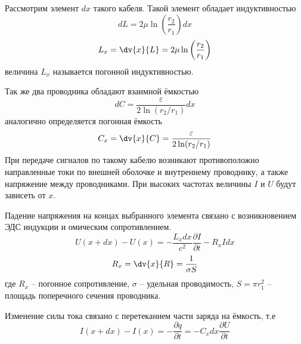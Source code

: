 \documentclass{report}
\begin{document}
Рассмотрим элемент $dx$ такого кабеля. Такой элемент обладает индуктивностью
\begin{equation}
	dL=2\mu\ln\left(\frac{r_2}{r_1}\right)dx
\end{equation}
\begin{equation}
	L_x=\dv{x}{L}=2\mu\ln\left(\frac{r_2}{r_1}\right)
\end{equation}
величина $L_x$ называется погонной индуктивностью.

Так же два проводника обладают взаимной ёмкостью
\begin{equation}
	dC=\frac{\varepsilon}{2\ln(r_2/r_1)}dx
\end{equation}
аналогично определяется погонная ёмкость
\begin{equation}
	C_x=\dv{x}{C}=\frac{\varepsilon}{2\ln(r_2/r_1)}
\end{equation}
При передаче сигналов по такому
кабелю возникают противоположно направленные токи по внешней оболочке и
внутреннему проводнику, а также напряжение между проводниками. При высоких
частотах величины $I$ и $U$ будут зависеть от $x$.

Падение напряжения на концах выбранного элемента связано с возникновением ЭДС
индукции и омическим сопротивлением.
\begin{equation}\label{Ueq}
	U(x+dx)-U(x)=-\frac{L_xdx}{c^2}\frac{\partial I}{\partial t}-R_xIdx
\end{equation}
\begin{equation}
	R_x = \dv{x}{R} = \frac{1}{\sigma S}
\end{equation}
где $R_x$ -- погонное сопротивление, $\sigma$ --
удельная проводимость, $S=\pi r_1^2$ -- площадь поперечного сечения проводника.

Изменение силы тока связано с перетеканием части заряда на ёмкость, т.е
\begin{equation}\label{Ieq}
	I(x+dx)-I(x)=-\frac{\partial q}{\partial t}=-C_x dx \frac{\partial U}{\partial t}
\end{equation}
\end{document}
